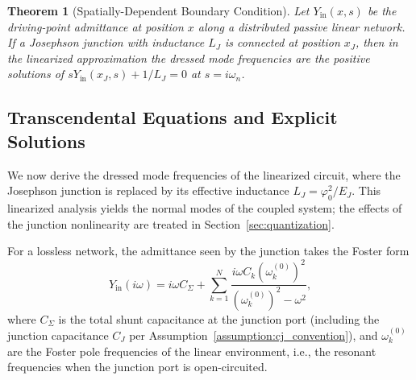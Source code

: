 \documentclass[reprint, floatfix, superscriptaddress, amsmath, amssymb, longbibliography]{revtex4-2}
\newtheorem{theorem}{Theorem}[section]
\begin{document}
\begin{theorem}[Spatially-Dependent Boundary Condition]
\label{thm:bc_spatial}
Let $Y_{\mathrm{in}}(x,s)$ be the driving-point admittance at position $x$ along a distributed passive linear network. If a Josephson junction with inductance $L_J$ is connected at position $x_J$, then in the linearized approximation the dressed mode frequencies are the positive solutions of $sY_{\mathrm{in}}(x_J,s) + 1/L_J = 0$ at $s = i\omega_n$.
\end{theorem}

\subsection{Transcendental Equations and Explicit Solutions}
\label{sec:transcendental}

We now derive the dressed mode frequencies of the linearized circuit, where the Josephson junction is replaced by its effective inductance $L_J = \varphi_0^2/E_J$. This linearized analysis yields the normal modes of the coupled system; the effects of the junction nonlinearity are treated in Section~\ref{sec:quantization}.

For a lossless network, the admittance seen by the junction takes the Foster form
\begin{equation}
Y_{\mathrm{in}}(i\omega) = i\omega C_\Sigma + \sum_{k=1}^{N} \frac{i\omega C_k (\omega_k^{(0)})^2}{(\omega_k^{(0)})^2 - \omega^2},
\label{eq:foster_general}
\end{equation}
where $C_\Sigma$ is the total shunt capacitance at the junction port (including the junction capacitance $C_J$ per Assumption~\ref{assumption:cj_convention}), and $\omega_k^{(0)}$ are the Foster pole frequencies of the linear environment, i.e., the resonant frequencies when the junction port is open-circuited.
\end{document}
